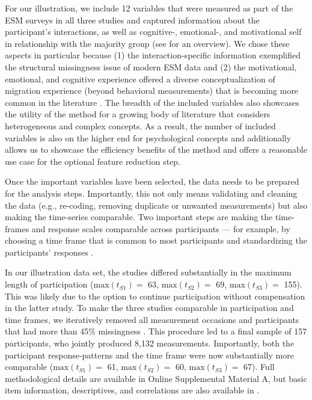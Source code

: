 For our illustration, we include 12 variables that were measured as part
of the ESM surveys in all three studies and captured information about
the participant's interactions, as well as cognitive-, emotional-, and
motivational self in relationship with the majority group (see
 for an overview). We chose these aspects in
particular because (1) the interaction-specific information exemplified
the structural missingness issue of modern ESM data and (2) the
motivational, emotional, and cognitive experience offered a diverse
conceptualization of migration experience (beyond behavioral
measurements) that is becoming more common in the literature
\citep[][]{Kreienkamp2022d}. The breadth of the included variables also
showcases the utility of the method for a growing body of literature
that considers heterogeneous and complex concepts. As a result, the
number of included variables is also on the higher end for psychological
concepts and additionally allows us to showcase the efficiency benefits
of the method and offers a reasonable use case for the optional feature
reduction step.



Once the important variables have been selected, the data needs to be
prepared for the analysis steps. Importantly, this not only means
validating and cleaning the data (e.g., re-coding, removing duplicate or
unwanted measurements) but also making the time-series comparable. Two
important steps are making the time-frames and response scales
comparable across participants --- for example, by choosing a time frame
that is common to most participants and standardizing the participants'
responses
\citep['data exclusion' and 'data transformation' in ; also see][]{liao2005}.

In our illustration data set, the studies differed substantially in the
maximum length of participation (\(\text{max}(t_{S1})=\) 63,
\(\text{max}(t_{S2})=\) 69, \(\text{max}(t_{S3})=\) 155). This was
likely due to the option to continue participation without compensation
in the latter study. To make the three studies comparable in
participation and time frames, we iteratively removed all measurement
occasions and participants that had more than 45\% missingness
\citep[which was in line with the general recommendation for data that might still need to rely on imputations for later model testing][]{Madley-Dowd2019}.
This procedure led to a final sample of 157 participants, who jointly
produced 8,132 measurements. Importantly, both the participant
response-patterns and the time frame were now substantially more
comparable (\(\text{max}(t_{S1})=\) 61, \(\text{max}(t_{S2})=\) 60,
\(\text{max}(t_{S3})=\) 67). Full methodological details are available
in Online Supplemental Material A, but basic item information,
descriptives, and correlations are also available in
.


